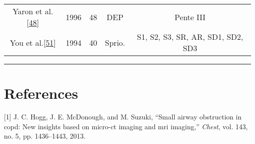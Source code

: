 \documentclass[12pt,]{article}
\begin{document}
\begin{landscape}
\begin{longtable}[]{@{}cllcc@{}}
\begin{minipage}[t]{0.31\columnwidth}\centering
Yaron et al.{[}\protect\hyperlink{ref-yaron1996utility}{48}{]}\strut
\end{minipage} & \begin{minipage}[t]{0.05\columnwidth}\raggedright
1996\strut
\end{minipage} & \begin{minipage}[t]{0.06\columnwidth}\raggedright
48\strut
\end{minipage} & \begin{minipage}[t]{0.12\columnwidth}\centering
DEP\strut
\end{minipage} & \begin{minipage}[t]{0.32\columnwidth}\centering
Pente III\strut
\end{minipage}\tabularnewline
\begin{minipage}[t]{0.31\columnwidth}\centering
You et al.{[}\protect\hyperlink{ref-you1994expiratory}{51}{]}\strut
\end{minipage} & \begin{minipage}[t]{0.05\columnwidth}\raggedright
1994\strut
\end{minipage} & \begin{minipage}[t]{0.06\columnwidth}\raggedright
40\strut
\end{minipage} & \begin{minipage}[t]{0.12\columnwidth}\centering
Sprio.\strut
\end{minipage} & \begin{minipage}[t]{0.32\columnwidth}\centering
S1, S2, S3, SR, AR, SD1, SD2, SD3\strut
\end{minipage}\tabularnewline
\bottomrule
\end{longtable}

\end{landscape}

\newpage

\begin{center}\rule{0.5\linewidth}{\linethickness}\end{center}

\hypertarget{references}{%
\section*{References}\label{references}}

\hypertarget{refs}{}
\leavevmode\hypertarget{ref-hogg2013small}{}%
{[}1{]} J. C. Hogg, J. E. McDonough, and M. Suzuki, ``Small airway
obstruction in copd: New insights based on micro-ct imaging and mri
imaging,'' \emph{Chest}, vol. 143, no. 5, pp. 1436--1443, 2013.
\end{document}
